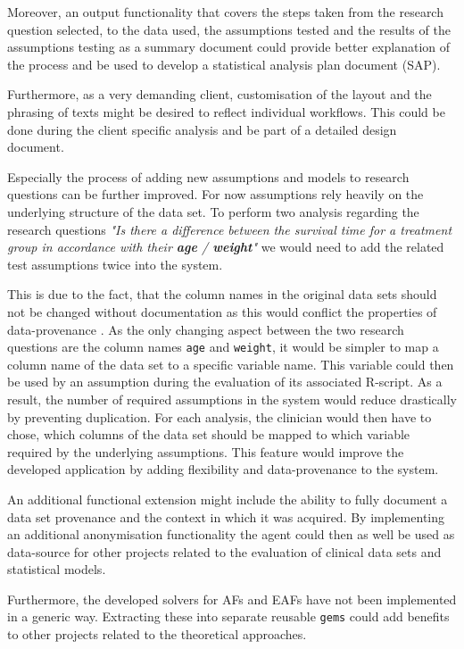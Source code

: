 Moreover, an output functionality that covers the steps taken from the research question selected, to the data used, the assumptions tested and the results of the assumptions testing as a summary document could provide better explanation of the process and be used to develop a statistical analysis plan document (SAP).

Furthermore, as a very demanding client, customisation of the layout and the phrasing of texts might be desired to reflect individual workflows. This could be done during the client specific analysis and be part of a detailed design document.


Especially the process of adding new assumptions and models to research questions can be further improved. For now assumptions rely heavily on the underlying structure of the data set. To perform two analysis regarding the research questions \textit{"Is there a difference between the survival time for a treatment group in accordance with their \textbf{age} / \textbf{weight}"} we would need to add the related test assumptions twice into the system. 

This is due to the fact, that the column names in the original data sets should not be changed without documentation as this would conflict the properties of data-provenance \cite{provenance}. As the only changing aspect between the two research questions are the column names \texttt{age} and \texttt{weight}, it would be simpler to map a column name of the data set to a specific variable name. This variable could then be used by an assumption during the evaluation of its associated \gls{R}-script. As a result, the number of required assumptions in the system would reduce drastically by preventing duplication. For each analysis, the clinician would then have to chose, which columns of the data set should be mapped to which variable required by the underlying assumptions. This feature would improve the developed application by adding flexibility and data-provenance to the system.

An additional functional extension might include the ability to fully document a data set provenance and the context in which it was acquired. By implementing an additional anonymisation functionality the agent could then as well be used as data-source for other projects related to the evaluation of clinical data sets and statistical models.

Furthermore, the developed solvers for \glspl{AF} and \glspl{EAF} have not been implemented in a generic way. Extracting these into separate reusable \texttt{gems} could add benefits to other projects related to the theoretical approaches.

